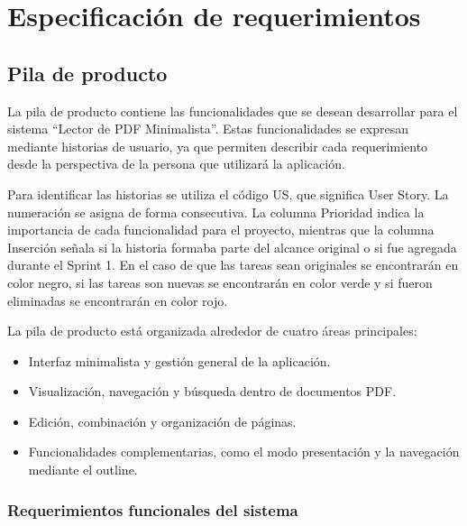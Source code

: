 \chapter{Especificación de requerimientos}
\section{Pila de producto}

La pila de producto contiene las funcionalidades que se desean desarrollar para el sistema “Lector de PDF Minimalista”. Estas funcionalidades se expresan mediante historias de usuario, ya que permiten describir cada requerimiento desde la perspectiva de la persona que utilizará la aplicación.

Para identificar las historias se utiliza el código US, que significa User Story. La numeración se asigna de forma consecutiva. La columna Prioridad indica la importancia de cada funcionalidad para el proyecto, mientras que la columna Inserción señala si la historia formaba parte del alcance original o si fue agregada durante el Sprint 1. En el caso de que las tareas sean originales se encontrarán en color negro, si las tareas son nuevas se encontrarán en color verde y si fueron eliminadas se encontrarán en color rojo.

La pila de producto está organizada alrededor de cuatro áreas principales:

\begin{itemize}
    \item Interfaz minimalista y gestión general de la aplicación.
    \item Visualización, navegación y búsqueda dentro de documentos PDF.
    \item Edición, combinación y organización de páginas.
    \item Funcionalidades complementarias, como el modo presentación y la navegación mediante el outline.
\end{itemize}

\subsection{Requerimientos funcionales del sistema}


